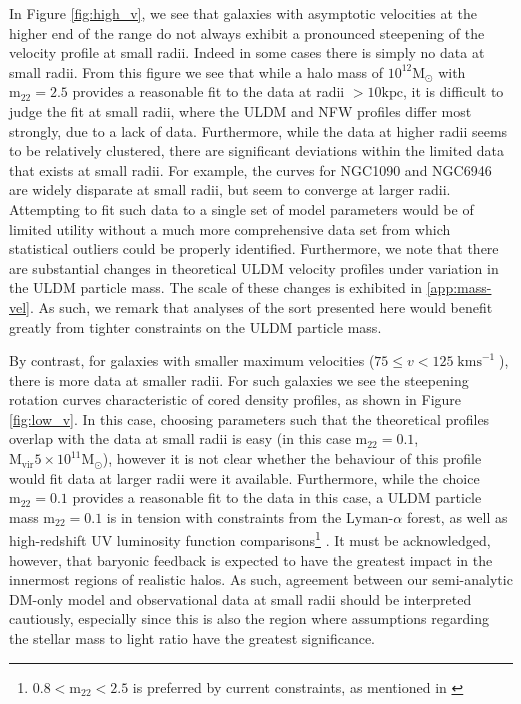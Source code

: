 \documentclass{pasa}%
\begin{document}
In Figure \ref{fig:high_v}, we see that galaxies with asymptotic velocities at the higher end of the range do not always exhibit a pronounced steepening of the velocity profile at small radii. Indeed in some cases there is simply no data at small radii. From this figure we see that while a halo mass of $10^{12} \mathrm{M}_{\odot}$ with $\mathrm{m_{22}} = 2.5$ provides a reasonable fit to the data at radii $>10 \mathrm{kpc}$, it is difficult to judge the fit at small radii, where the ULDM and NFW profiles differ most strongly, due to a lack of data. Furthermore, while the data at higher radii seems to be relatively clustered, there are significant deviations within the limited data that exists at small radii. For example, the curves for NGC1090 and NGC6946 are widely disparate at small radii, but seem to converge at larger radii. Attempting to fit such data to a single set of model parameters would be of limited utility without a much more comprehensive data set from which statistical outliers could be properly identified. Furthermore, we note that there are substantial changes in theoretical ULDM velocity profiles under variation in the ULDM particle mass. The scale of these changes is exhibited in \ref{app:mass-vel}. As such, we remark that analyses of the sort presented here would benefit greatly from tighter constraints on the ULDM particle mass. 

By contrast, for galaxies with smaller maximum velocities ($75 \leq v < 125\operatorname{kms}^{-1}$), there is more data at smaller radii. For such galaxies we see the steepening rotation curves characteristic of cored density profiles, as shown in Figure \ref{fig:low_v}. In this case, choosing parameters such that the theoretical profiles overlap with the data at small radii is easy (in this case $\mathrm{m_{22}} = 0.1$, $\mathrm{M}_{\mathrm{vir}}5\times10^{11} \mathrm{M}_{\odot}$), however it is not clear whether the behaviour of this profile would fit data at larger radii were it available. Furthermore, while the choice $\mathrm{m_{22}} = 0.1$ provides a reasonable fit to the data in this case, a ULDM particle mass $\mathrm{m_{22}} = 0.1$ is in tension with constraints from the Lyman-$\alpha$ forest, as well as high-redshift UV luminosity function comparisons\footnote{$ 0.8 < \mathrm{m_{22}} < 2.5$ is preferred by current constraints, as mentioned in \cite{Robles:2018fur}} \cite{Amendola:2005ad, Bozek:2014uqa, Armengaud:2017nkf, Ni:2019qfa, Nebrin:2018vqt}. It must be acknowledged, however, that baryonic feedback is expected to have the greatest impact in the innermost regions of realistic halos. As such, agreement between our semi-analytic DM-only model and observational data at small radii should be interpreted cautiously, especially since this is also the region where assumptions regarding the stellar mass to light ratio have the greatest significance.  
\end{document}
